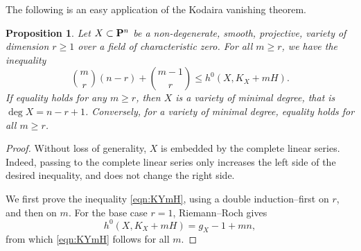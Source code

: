 \documentclass[11pt,reqno]{amsart}
\theoremstyle{plain}
\newtheorem{proposition}[theorem]{Proposition}
\theoremstyle{definition}
\theoremstyle{remark}
\numberwithin{equation}{section}
\numberwithin{equation}{section}
\begin{document}
The following is an easy application of the Kodaira vanishing theorem.
\begin{proposition}\label{lemma:KYmH}
  Let $X \subset \P^n$ be a non-degenerate, smooth, projective, variety of dimension $r \geq 1$ over a field of characteristic zero.
  For all $m \geq r$, we have the inequality
  \begin{equation}\label{eqn:KYmH}
    {m \choose r}(n-r) + {{m-1} \choose {r}}\leq h^0(X, K_X + mH).
  \end{equation}
  If equality holds for any $m \geq r$, then $X$ is a variety of minimal degree, that is $\deg X = n-r+1$.
  Conversely, for a variety of minimal degree, equality holds for all $m \geq r$.
\end{proposition}

\begin{proof}
  Without loss of generality, $X$ is embedded by the complete linear series.
  Indeed, passing to the complete linear series only increases the left side of the desired inequality, and does not change the right side.
  
  We first prove the inequality \eqref{eqn:KYmH}, using a double induction--first on $r$, and then on $m$.
  For the base case $r = 1$, Riemann--Roch gives
  \begin{equation}\label{eqn:r1}
    h^0(X, K_X + mH) = g_X - 1 + mn,
  \end{equation}
  from which \eqref{eqn:KYmH} follows for all $m$.


\end{proof}
\end{document}
